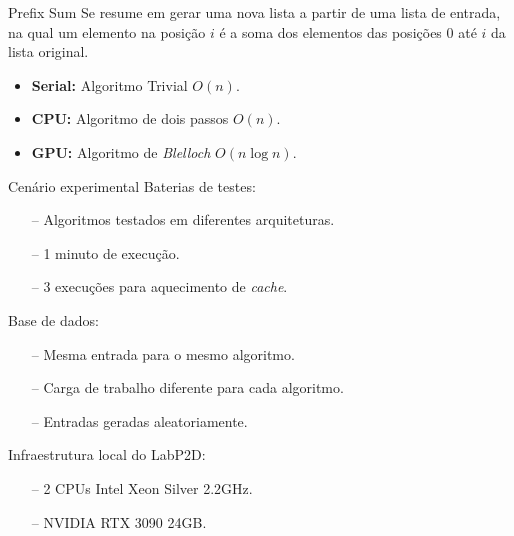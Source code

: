 \begin{frame}{Prefix Sum}
    Se resume em gerar uma nova lista a partir de uma lista de entrada, na qual um elemento na posição $i$ é a soma dos elementos das posições $0$ até $i$ da lista original.
    \vspace{1em}
    \begin{itemize}
        \item \textbf{Serial:} Algoritmo Trivial $O(n)$.
        \item \textbf{CPU:} Algoritmo de dois passos $O(n)$.
        \item \textbf{GPU:} Algoritmo de \textit{Blelloch} $O(n \log n)$.
    \end{itemize}
\end{frame}


\begin{frame}{Cenário experimental}
    Baterias de testes:
    \begin{itemize}
        \item[--] Algoritmos testados em diferentes arquiteturas.
        \item[--] 1 minuto de execução.
        \item[--] 3 execuções para aquecimento de \textit{cache}.
    \end{itemize} 
    \vspace{1em}
    Base de dados:
    \begin{itemize}
        \item[--] Mesma entrada para o mesmo algoritmo.
        \item[--] Carga de trabalho diferente para cada algoritmo.
        \item[--] Entradas geradas aleatoriamente.
    \end{itemize}
    \vspace{1em}
    Infraestrutura local do LabP2D:
    \begin{itemize}
        \item[--] 2 CPUs Intel Xeon Silver 2.2GHz.
        \item[--] NVIDIA RTX 3090 24GB.
    \end{itemize}
\end{frame}

